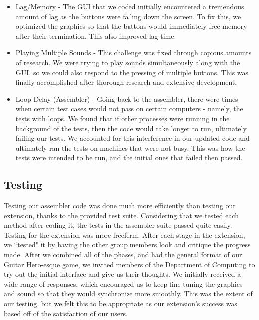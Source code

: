 \documentclass[11pt]{article}
\begin{document}
\begin{itemize}

\item Lag/Memory - The GUI that we coded initially encountered a tremendous amount of lag as the buttons were falling down the screen. To fix this, we optimized the graphics so that the buttons would immediately free memory after their termination. This also improved lag time.

\item Playing Multiple Sounds - This challenge was fixed through copious amounts of research. We were trying to play sounds simultaneously along with the GUI, so we could also respond to the pressing of multiple buttons. This was finally accomplished after thorough research and extensive development.

\item Loop Delay (Assembler) - Going back to the assembler, there were times when certain test cases would not pass on certain computers - namely, the tests with loops. We found that if other processes were running in the background of the tests, then the code would take longer to run, ultimately failing our tests. We accounted for this interference in our updated code and ultimately ran the tests on machines that were not busy. This was how the tests were intended to be run, and the initial ones that failed then passed.

\end{itemize}

\subsection{Testing}

Testing our assembler code was done much more efficiently than testing our extension, thanks to the provided test suite. Considering that we tested each method after coding it, the tests in the assembler suite passed quite easily. Testing for the extension was more freeform. After each stage in the extension, we ``tested" it by having the other group members look and critique the progress made. After we combined all of the phases, and had the general format of our Guitar Hero-esque game, we invited members of the Department of Computing to try out the initial interface and give us their thoughts. We initially received a wide range of responses, which encouraged us to keep fine-tuning the graphics and sound so that they would synchronize more smoothly. This was the extent of our testing, but we felt this to be appropriate as our extension's success was based off of the satisfaction of our users.
\end{document}
